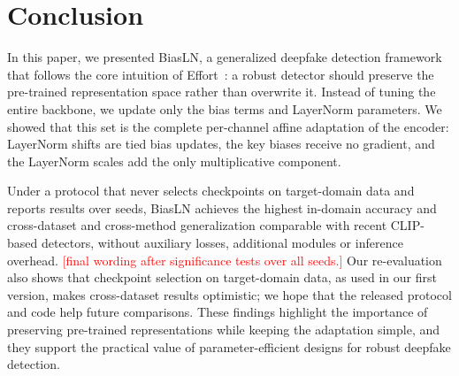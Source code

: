 \documentclass[fonts]{icst}
\newif\ifrevmark\revmarkfalse
\newcommand{\rev}[1]{\ifrevmark{\color{revblue}#1}\else#1\fi}
\newif\ifpending\pendingtrue
\newcommand{\pending}[1]{\ifpending\textcolor{red}{[#1]}\else\errmessage{pending text left: #1}\fi}
\begin{document}
\begin{table}[t]
\centering
\captionsetup{labelsep=period, labelfont=bf, hypcap=false}
\caption{\rev{Measured cost on an NVIDIA A100-40GB (fp32, $224\times224$). Train: batch 32, forward + backward + Adam step. Infer: batch 1. Ckpt: size of the stored trainable tensors.}}
\label{tab:cost}
\end{table}


\section{Conclusion}

In this paper, we presented BiasLN, a generalized deepfake detection framework that follows the core intuition of Effort~\cite{yan2025effort}: a robust detector should preserve the pre-trained representation space \rev{rather than overwrite it}.
Instead of tuning the entire backbone, we update only the bias terms and LayerNorm parameters. \rev{We showed that this set is the complete per-channel affine adaptation of the encoder: LayerNorm shifts are tied bias updates, the key biases receive no gradient, and the LayerNorm scales add the only multiplicative component.}

\rev{Under a protocol that never selects checkpoints on target-domain data and reports results over seeds, BiasLN achieves the highest in-domain accuracy and cross-dataset and cross-method generalization comparable with recent CLIP-based detectors, without auxiliary losses, additional modules or inference overhead.} \pending{final wording after significance tests over all seeds.}
\rev{Our re-evaluation also shows that checkpoint selection on target-domain data, as used in our first version, makes cross-dataset results optimistic; we hope that the released protocol and code help future comparisons.}
These findings highlight the importance of preserving pre-trained representations while keeping the adaptation simple, and they support the practical value of parameter-efficient designs for robust deepfake detection.
\end{document}
